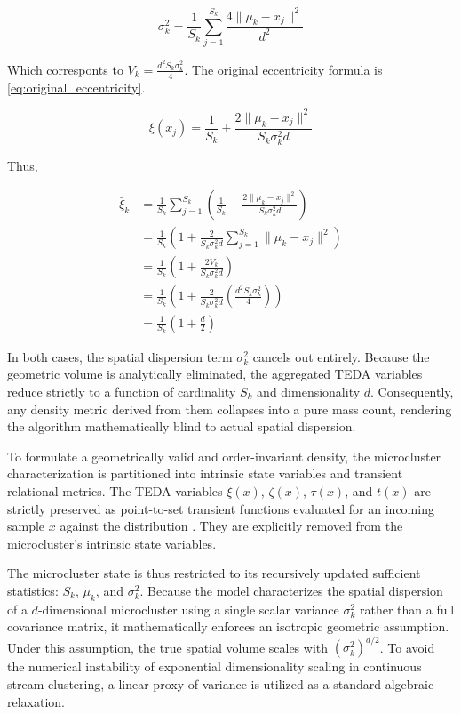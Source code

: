 \begin{equation}
    \sigma^2_k = \frac{1}{S_k} \sum_{j=1}^{S_k} \frac{4\lVert \mu_k - x_j \rVert^2}{d^2}
\end{equation}

Which corresponts to $V_k = \frac{d^2 S_k \sigma^2_k}{4}$. The original eccentricity formula is \cref{eq:original_eccentricity}.

\begin{equation}
    \xi(x_j) = \frac{1}{S_k} + \frac{2\lVert \mu_k - x_j \rVert^2}{S_k \sigma^2_k d}
    \label{eq:original_eccentricity}
\end{equation}

Thus,

\begin{align}
    \bar{\xi}_k &= \frac{1}{S_k} \sum_{j=1}^{S_k} \left( \frac{1}{S_k} + \frac{2\lVert \mu_k - x_j \rVert^2}{S_k \sigma^2_k d} \right) \nonumber \\
                &= \frac{1}{S_k} \left( 1 + \frac{2}{S_k \sigma^2_k d} \sum_{j=1}^{S_k} \lVert \mu_k - x_j \rVert^2 \right) \nonumber \\
                &= \frac{1}{S_k} \left( 1 + \frac{2 V_k}{S_k \sigma^2_k d} \right) \nonumber \\
                &= \frac{1}{S_k} \left( 1 + \frac{2}{S_k \sigma^2_k d} \left( \frac{d^2 S_k \sigma^2_k}{4} \right) \right) \nonumber \\
                &= \frac{1}{S_k} \left( 1 + \frac{d}{2} \right)
\end{align}

In both cases, the spatial dispersion term $\sigma^2_k$ cancels out entirely. Because the geometric volume is analytically eliminated, the aggregated TEDA variables reduce strictly to a function of cardinality $S_k$ and dimensionality $d$. Consequently, any density metric derived from them collapses into a pure mass count, rendering the algorithm mathematically blind to actual spatial dispersion.

To formulate a geometrically valid and order-invariant density, the microcluster characterization is partitioned into intrinsic state variables and transient relational metrics. The TEDA variables $\xi(x)$, $\zeta(x)$, $\tau(x)$, and $t(x)$ are strictly preserved as point-to-set transient functions evaluated for an incoming sample $x$ against the distribution \cite{angelov2014outside}. They are explicitly removed from the microcluster's intrinsic state variables.

The microcluster state is thus restricted to its recursively updated sufficient statistics: $S_k$, $\mu_k$, and $\sigma^2_k$. Because the model characterizes the spatial dispersion of a $d$-dimensional microcluster using a single scalar variance $\sigma^2_k$ rather than a full covariance matrix, it mathematically enforces an isotropic geometric assumption. Under this assumption, the true spatial volume scales with $(\sigma^2_k)^{d/2}$. To avoid the numerical instability of exponential dimensionality scaling in continuous stream clustering, a linear proxy of variance is utilized as a standard algebraic relaxation.

